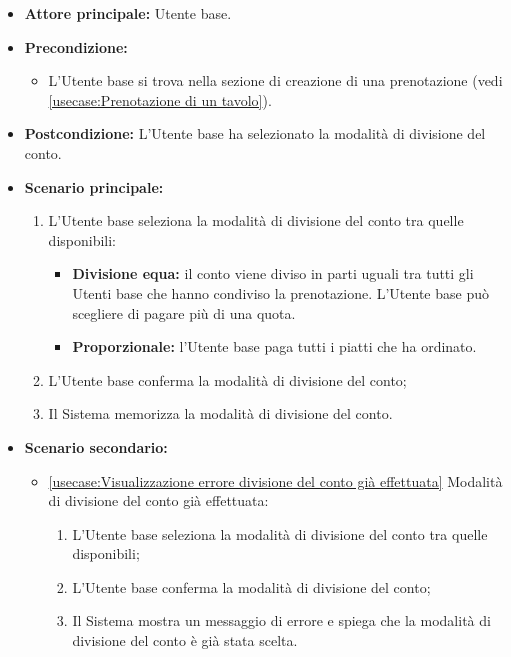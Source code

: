 \label{usecase:Selezione della modalità di divisione del conto}


\begin{itemize}
	\item \textbf{Attore principale:} Utente base.
	
	\item \textbf{Precondizione:}
	\begin{itemize}
		\item L'Utente base si trova nella sezione di creazione di una prenotazione (vedi \autoref{usecase:Prenotazione di un tavolo}).
	\end{itemize}

	\item \textbf{Postcondizione:}
	      L'Utente base ha selezionato la modalità di divisione del conto.
	\item \textbf{Scenario principale:}
	      \begin{enumerate}
		      \item L'Utente base seleziona la modalità di divisione del conto
		            tra quelle disponibili:
					\begin{itemize}
						\item \textbf{Divisione equa:} il conto viene diviso in parti
							  uguali tra tutti gli Utenti base che hanno condiviso la
							  prenotazione. L'Utente base può scegliere di pagare più di
							  una quota.
		  
						\item \textbf{Proporzionale:} l'Utente base paga tutti i piatti che ha ordinato.
					\end{itemize}

		      \item L'Utente base conferma la modalità di divisione del conto;

		      \item Il Sistema memorizza la modalità di divisione del conto.
	      \end{enumerate}

	\item \textbf{Scenario secondario:}
		  \begin{itemize}
			  \item \autoref{usecase:Visualizzazione errore divisione del conto già effettuata} Modalità di divisione del conto già effettuata:
				\begin{enumerate}
					\item L'Utente base seleziona la modalità di divisione del conto
						tra quelle disponibili;
	
					\item L'Utente base conferma la modalità di divisione del conto;
	
					\item Il Sistema mostra un messaggio di errore e spiega che la
						modalità di divisione del conto è già stata scelta.
				\end{enumerate}
		  \end{itemize}

\end{itemize}


